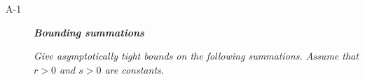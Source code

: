   \begin{description}
    \item[A-1] {\itshape \bfseries Bounding summations}

        {\itshape Give asymptotically tight bounds on the following summations. Assume that $r > 0$ and $s > 0$ are constants.}


        \begin{pbrev}
        \end{pbrev}

  \end{description}
